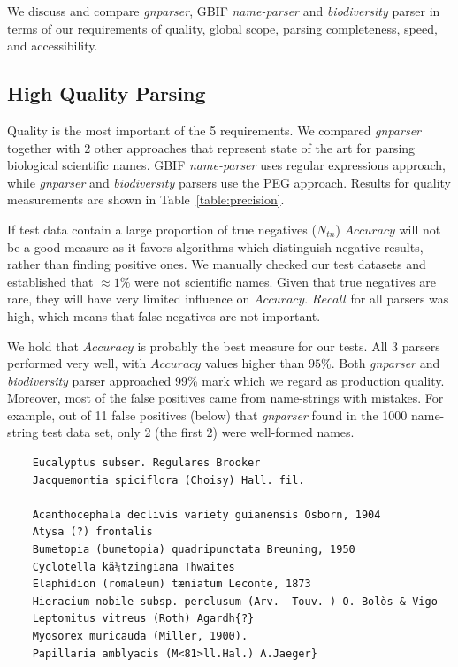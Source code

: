 \documentclass{bmcart}
\makeatletter
\newcommand{\verbatimfont}[1]{\def\verbatim@font{#1}}%
\makeatother
\begin{document}
We discuss and compare \textit{gnparser}, GBIF \textit{name-parser} and
\textit{biodiversity} parser in terms of our requirements of
quality, global scope, parsing completeness, speed, and accessibility.


\subsection*{High Quality Parsing}

Quality is the most important of the 5 requirements.  We
compared \textit{gnparser} together with 2 other approaches that
represent state of the art for parsing biological scientific names. GBIF
\textit{name-parser} uses regular expressions approach, while \textit{gnparser}
and \textit{biodiversity} parsers use the PEG approach.  Results for quality
measurements are shown in Table~\ref{table:precision}.

If test data contain a large proportion of true negatives ($N_{tn}$) $Accuracy$
will not be a good measure as it favors algorithms which distinguish negative
results, rather than finding positive ones. We manually checked our test
datasets and established that  $\approx1\%$ were not scientific names. Given
that true negatives are rare, they will have very limited influence on
$Accuracy$. $Recall$ for all parsers was high, which means that false negatives
are not important.

We hold that $Accuracy$ is probably the best measure for our tests. All 3
parsers performed very well, with $Accuracy$ values higher than $95\%$. Both
\textit{gnparser} and \textit{biodiversity} parser approached 99\% mark which
we regard as production quality. Moreover, most of the false positives came
from name-strings with mistakes. For example, out of 11 false positives (below)
that \textit{gnparser} found in the 1000 name-string test data set, only 2 (the
first 2) were well-formed names.

\vspace{0.5cm}

\verbatimfont{\bfseries\rmfamily\small}

\begin{verbatim}
    Eucalyptus subser. Regulares Brooker
    Jacquemontia spiciflora (Choisy) Hall. fil.

    Acanthocephala declivis variety guianensis Osborn, 1904
    Atysa (?) frontalis
    Bumetopia (bumetopia) quadripunctata Breuning, 1950
    Cyclotella kã¼tzingiana Thwaites
    Elaphidion (romaleum) tæniatum Leconte, 1873
    Hieracium nobile subsp. perclusum (Arv. -Touv. ) O. Bolòs & Vigo
    Leptomitus vitreus (Roth) Agardh{?}
    Myosorex muricauda (Miller, 1900).
    Papillaria amblyacis (M<81>ll.Hal.) A.Jaeger}
\end{verbatim}
\end{document}
